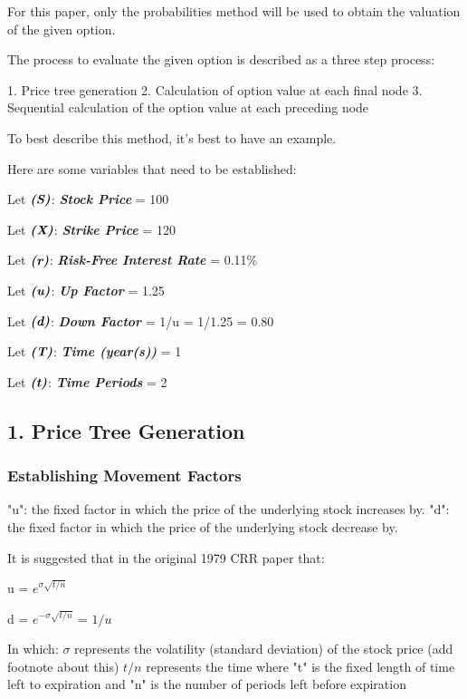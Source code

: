 \documentclass[12pt, letterpaper]{article}
\begin{document}
For this paper, only the probabilities method will be used to obtain the valuation of the given option. 

The process to evaluate the given option is described as a three step process: %

1. Price tree generation
2. Calculation of option value at each final node
3. Sequential calculation of the option value at each preceding node

To best describe this method, it's best to have an example.

Here are some variables that need to be established:

Let ${\textit{\textbf{(S)}}}$: \textit{\textbf{Stock Price}} = 100

Let ${\textit{\textbf{(X)}}}$: \textit{\textbf{Strike Price}} = 120

Let ${\textit{\textbf{(r)}}}$: \textit{\textbf{Risk-Free Interest Rate}} = 0.11\%

Let ${\textit{\textbf{(u)}}}$: \textit{\textbf{Up Factor}} = 1.25

Let ${\textit{\textbf{(d)}}}$: \textit{\textbf{Down Factor}} = 1/u = 1/1.25 = 0.80

Let ${\textit{\textbf{(T)}}}$: \textit{\textbf{Time (year(s))}}  = 1

Let ${\textit{\textbf{(t)}}}$: \textit{\textbf{Time Periods}}  = 2 

\subsection*{1. Price Tree Generation}
\subsubsection*{Establishing Movement Factors}
"u": the fixed factor in which the price of the underlying stock increases by.
"d": the fixed factor in which the price of the underlying stock decrease by.

It is suggested that in the original 1979 CRR paper that:

u = ${e}^{\sigma\sqrt{t/n}}$

d = ${e}^{-\sigma\sqrt{t/n}}$ = ${1/u}$

In which:
${\sigma}$ represents the volatility (standard deviation) of the stock price (add footnote about this) %
${t/n}$ represents the time where "t" is the fixed length of time left to expiration and "n" is the number of periods left before expiration
\end{document}
